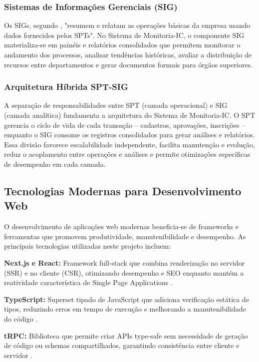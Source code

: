 \documentclass[portuguese]{sbc2025}%
\begin{document}
\subsubsection{Sistemas de Informações Gerenciais (SIG)}

Os SIGs, segundo \cite{Laudon_Laudon_2011}, "resumem e relatam as operações básicas da empresa usando dados fornecidos pelos SPTs". No Sistema de Monitoria-IC, o componente SIG materializa-se em painéis e relatórios consolidados que permitem monitorar o andamento dos processos, analisar tendências históricas, avaliar a distribuição de recursos entre departamentos e gerar documentos formais para órgãos superiores.

\subsubsection{Arquitetura Híbrida SPT-SIG}

A separação de responsabilidades entre SPT (camada operacional) e SIG (camada analítica) fundamenta a arquitetura do Sistema de Monitoria-IC. O SPT gerencia o ciclo de vida de cada transação – cadastros, aprovações, inscrições – enquanto o SIG consome os registros consolidados para gerar análises e relatórios. Essa divisão favorece escalabilidade independente, facilita manutenção e evolução, reduz o acoplamento entre operações e análises e permite otimizações específicas de desempenho em cada camada.

\subsection{Tecnologias Modernas para Desenvolvimento Web}

O desenvolvimento de aplicações web modernas beneficia-se de frameworks e ferramentas que promovem produtividade, manutenibilidade e desempenho. As principais tecnologias utilizadas neste projeto incluem:

\textbf{Next.js e React:} Framework full-stack que combina renderização no servidor (SSR) e no cliente (CSR), otimizando desempenho e SEO enquanto mantém a reatividade característica de Single Page Applications \cite{Vercel2024}.

\textbf{TypeScript:} Superset tipado de JavaScript que adiciona verificação estática de tipos, reduzindo erros em tempo de execução e melhorando a manutenibilidade do código \cite{Microsoft2024}.

\textbf{tRPC:} Biblioteca que permite criar APIs type-safe sem necessidade de geração de código ou schemas compartilhados, garantindo consistência entre cliente e servidor \cite{TRPC2024}.
\end{document}
